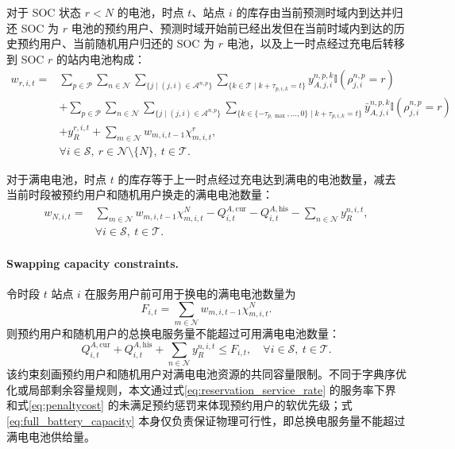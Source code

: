 \documentclass[12pt,hyperref,a4paper,UTF8]{ctexart}
\begin{document}
对于 SOC 状态 $r<N$ 的电池，时点 $t$、站点 $i$ 的库存由当前预测时域内到达并归还 SOC 为 $r$ 电池的预约用户、预测时域开始前已经出发但在当前时域内到达的历史预约用户、当前随机用户归还的 SOC 为 $r$ 电池，以及上一时点经过充电后转移到 SOC $r$ 的站内电池构成：
\begin{equation}
\begin{aligned}
w_{r,i,t}
=&
\sum_{p\in \mathcal{P}}
\sum_{n\in \mathcal{N}}
\sum_{\{j\mid (j,i)\in \mathcal{A}^{n,p}\}}
\sum_{\{k\in \mathcal{T}\mid k+\tau_{p,i,k}=t\}}
y_{A,j,i}^{n,p,k}
\mathbb{I}\!\left(\rho_{j,i}^{n,p}=r\right)
\\
&+
\sum_{p\in \mathcal{P}}
\sum_{n\in \mathcal{N}}
\sum_{\{j\mid (j,i)\in \mathcal{A}^{n,p}\}}
\sum_{\{k\in\{-\tau_{p,\max},\ldots,0\}\mid k+\tau_{p,i,k}=t\}}
\bar{y}_{A,j,i}^{n,p,k}
\mathbb{I}\!\left(\rho_{j,i}^{n,p}=r\right)
\\
&+
y_R^{r,i,t}
+
\sum_{m\in \mathcal{N}}
w_{m,i,t-1}\chi_{m,i,t}^{r},
\\
&\forall i\in \mathcal{S},\ r\in \mathcal{N}\setminus\{N\},\ t\in \mathcal{T}.
\end{aligned}
\label{eq:transition_nonfull}
\end{equation}

对于满电电池，时点 $t$ 的库存等于上一时点经过充电达到满电的电池数量，减去当前时段被预约用户和随机用户换走的满电电池数量：
\begin{equation}
\begin{aligned}
w_{N,i,t}
=&
\sum_{m\in \mathcal{N}}
w_{m,i,t-1}\chi_{m,i,t}^{N}
-
Q_{i,t}^{A,\mathrm{cur}}
-
Q_{i,t}^{A,\mathrm{his}}
-
\sum_{n\in \mathcal{N}}y_R^{n,i,t},
\\
&\forall i\in \mathcal{S},\ t\in \mathcal{T}.
\end{aligned}
\label{eq:transition_full}
\end{equation}


\paragraph{Swapping capacity constraints.}
令时段 $t$ 站点 $i$ 在服务用户前可用于换电的满电电池数量为
\begin{equation}
F_{i,t}=\sum_{m\in\mathcal{N}}w_{m,i,t-1}\chi_{m,i,t}^{N}.
\label{eq:available_full_batteries}
\end{equation}
则预约用户和随机用户的总换电服务量不能超过可用满电电池数量：
\begin{equation}
Q_{i,t}^{A,\mathrm{cur}}+Q_{i,t}^{A,\mathrm{his}}+
\sum_{n\in\mathcal{N}}y_R^{n,i,t}
\le F_{i,t},
\quad \forall i\in\mathcal{S},\ t\in\mathcal{T}.
\label{eq:full_battery_capacity}
\end{equation}
该约束刻画预约用户和随机用户对满电电池资源的共同容量限制。不同于字典序优化或局部剩余容量规则，本文通过式\eqref{eq:reservation_service_rate} 的服务率下界和式\eqref{eq:penaltycost} 的未满足预约惩罚来体现预约用户的软优先级；式\eqref{eq:full_battery_capacity} 本身仅负责保证物理可行性，即总换电服务量不能超过满电电池供给量。
\end{document}

